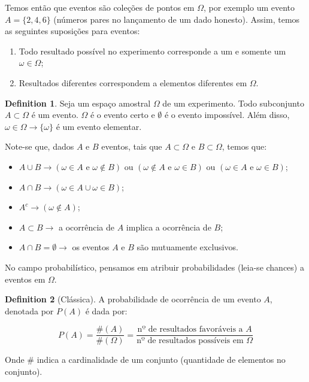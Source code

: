 \documentclass[
]{article}
\providecommand{\tightlist}{%
  \setlength{\itemsep}{0pt}\setlength{\parskip}{0pt}}
\theoremstyle{definition}
\newtheorem{definition}{Definition}[section]
\theoremstyle{definition}
\theoremstyle{definition}
\theoremstyle{definition}
\theoremstyle{remark}
\begin{document}
Temos então que eventos são coleções de pontos em \(\Omega\), por exemplo um evento \(A = \{2,4,6\}\) (números pares no lançamento de um dado honesto). Assim, temos as seguintes suposições para eventos:

\begin{enumerate}
\def\labelenumi{\arabic{enumi}.}
\tightlist
\item
  Todo resultado possível no experimento corresponde a um e somente um \(\omega \in \Omega\);
\item
  Resultados diferentes correspondem a elementos diferentes em \(\Omega\).
\end{enumerate}

\begin{definition}
Seja um espaço amostral \(\Omega\) de um experimento. Todo subconjunto \(A \subset \Omega\) é um evento. \(\Omega\) é o evento certo e \(\emptyset\) é o evento impossível. Além disso, \(\omega \in \Omega \to \{\omega\}\) é um evento elementar.
\end{definition}

Note-se que, dados \(A\) e \(B\) eventos, tais que \(A \subset \Omega\) e \(B \subset \Omega\), temos que:

\begin{itemize}
\tightlist
\item
  \(A \cup B \to (\omega \in A \text{ e } \omega \notin B)\) ou \((\omega \notin A \text{ e } \omega \in B)\) ou \((\omega \in A \text{ e } \omega \in B)\);
\item
  \(A \cap B \to (\omega \in A \cup \omega \in B)\);
\item
  \(A^{c} \to (\omega \notin A)\);
\item
  \(A \subset B \to\) a ocorrência de \(A\) implica a ocorrência de \(B\);
\item
  \(A \cap B = \emptyset \to\) os eventos \(A\) e \(B\) são mutuamente exclusivos.
\end{itemize}

No campo probabilístico, pensamos em atribuir probabilidades (leia-se chances) a eventos em \(\Omega\).

\begin{definition}[Clássica]
A probabilidade de ocorrência de um evento \(A\), denotada por \(P(A)\) é dada por:

\[P(A) = \frac{\#(A)}{\#(\Omega)} = \frac{\text{nº de resultados favoráveis a }A}{\text{nº de resultados possíveis em }\Omega}\]

Onde \(\#\) indica a cardinalidade de um conjunto (quantidade de elementos no conjunto).
\end{definition}
\end{document}
